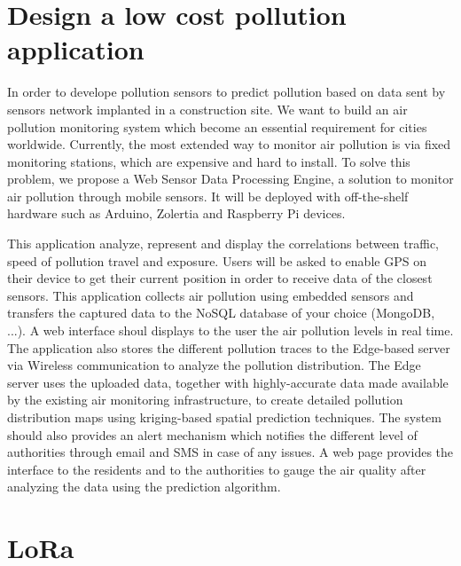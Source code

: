 
\section{Design a low cost pollution application}

In order to develope pollution sensors to predict pollution based on data sent by sensors network implanted in a construction site\cite{alvear_architecture_2016,rosmiati_air_2019}.
We want to build an air pollution monitoring system which become an essential requirement for cities worldwide.
Currently,
	the most extended way to monitor air pollution is via fixed monitoring stations\cite{paredes-parra_alternative_2019},
	which are expensive and hard to install.
To solve this problem,
	we propose a Web Sensor Data Processing Engine,
	a solution to monitor air pollution through mobile sensors.
It will be deployed with off-the-shelf hardware such as Arduino, Zolertia and Raspberry Pi devices.

This application analyze,
	represent and display the correlations between traffic,
	speed of pollution travel and exposure.
Users will be asked to enable GPS on their device to get their current position in order to receive data of the closest sensors.
This application collects air pollution using embedded sensors and transfers the captured data to the NoSQL database of your choice (MongoDB, ...).
A web interface shoul displays to the user the air pollution levels in real time.
The application also stores the different pollution traces to the Edge-based server via Wireless communication to analyze the pollution distribution.
The Edge server uses the uploaded data,
	together with highly-accurate data made available by the existing air monitoring infrastructure,
	to create detailed pollution distribution maps using kriging-based spatial prediction techniques.
The system should also provides an alert mechanism which notifies the different level of authorities through email and SMS in case of any issues.
A web page provides the interface to the residents and to the authorities to gauge the air quality after analyzing the data using the prediction algorithm.

\section{LoRa}

